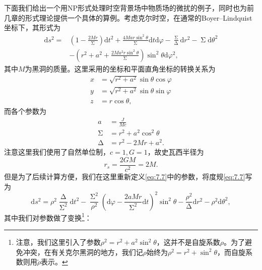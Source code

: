 下面我们给出一个用NP形式处理时空背景场中物质场的微扰的例子，同时也为前几章的形式理论提供一个具体的算例。考虑克尔时空，在通常的Boyer–Lindquist坐标下，其形式为\parencite{teukolsky2015kerr}
\begin{equation}
	\begin{aligned}
		\mathrm{d} s^{2} = & \left( 1-\frac{2Mr}{\upSigma }\right)\mathrm{d} t^{2} +\frac{4Mar\sin^{2} \theta }{\upSigma }\mathrm{d} t\mathrm{d} \varphi -\frac{\upSigma }{\upDelta }\mathrm{d} r^{2} -\upSigma \mathrm{d} \theta ^{2}\\
		& -\left( r^{2} +a^{2} +\frac{2Ma^{2} r\sin^{2} \theta }{\upSigma }\right)\sin^{2} \theta \mathrm{d} \varphi ^{2} ,
	\end{aligned}
	\label{eq:7.7}
\end{equation}
其中$M$为黑洞的质量。这里采用的坐标和平面直角坐标的转换关系为
\begin{equation*}
	\begin{aligned}
		x & =\sqrt{r^{2} +a^{2}}\sin \theta \cos \varphi \\
		y & =\sqrt{r^{2} +a^{2}}\sin \theta \sin \varphi \\
		z & =r\cos \theta ,
	\end{aligned}
\end{equation*}
而各个参数为
\begin{equation*}
	\begin{aligned}
		a & =\frac{J}{Mc}\\
		\upSigma  & =r^{2} +a^{2}\cos^{2} \theta \\
		\upDelta  & =r^{2} -2Mr+a^{2} .
	\end{aligned}
\end{equation*}
注意这里我们使用了自然单位制，$c=1,G=1$，故史瓦西半径为
\begin{equation*}
	r_{s} =\frac{2GM}{c^{2}} =2M.
\end{equation*}
但是为了后续计算方便，我们在这里重新定义\ref{eq:7.7}中的参数，将度规\ref{eq:7.7}写为\parencite{chandrasekhar1998mathematical}
\begin{equation}
	\mathrm{d} s^{2} =\rho ^{2}\frac{\upDelta }{\upSigma ^{2}}\mathrm{d} t^{2} -\frac{\upSigma ^{2}}{\rho ^{2}}\left(\mathrm{d} \varphi -\frac{2aMr}{\upSigma ^{2}}\mathrm{d} t\right)^{2}\sin^{2} \theta -\frac{\rho ^{2}}{\upDelta }\mathrm{d} r^{2} -\rho ^{2}\mathrm{d} \theta ^{2} ,
	\label{eq:7.8}
\end{equation}
其中我们对参数做了变换\footnote{注意，我们这里引入了参数$\rho ^{2} =r^{2} +a^{2}\sin^{2} \theta $，这并不是自旋系数$\rho $。为了避免冲突，在有关克尔黑洞的地方，我们记$\rho $始终为$\rho ^{2} =r^{2} +\sin^{2} \theta $，而自旋系数则用$\tilde{\rho }$表示。}：
